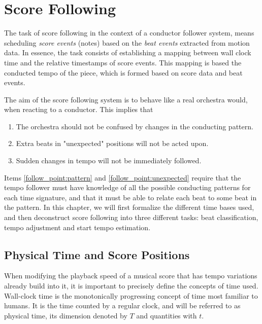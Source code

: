 \chapter{Score Following}
\label{chapter:score_following}

The task of score following in the context
of a conductor follower system,
means scheduling \textit{score events} (notes)
based on the \textit{beat events} extracted
from motion data.
In essence, the task consists of establishing a mapping between
wall clock time and the relative timestamps of score events.
This mapping is based the conducted tempo of the piece,
which is formed based on score data and beat events.

The aim of the score following system
is to behave like a real orchestra would,
when reacting to a conductor.
This implies that
\begin{enumerate}
\item The orchestra should not be confused by changes in the conducting pattern. \label{follow_point:pattern}
\item Extra beats in "unexpected" positions will not be acted upon. \label{follow_point:unexpected}
\item Sudden changes in tempo will not be immediately followed.
\end{enumerate}
Items \ref{follow_point:pattern} and \ref{follow_point:unexpected} require
that the tempo follower must have knowledge of all the possible
conducting patterns for each time signature,
and that it must be able to relate each beat to some beat in the pattern.
In this chapter,
we will first formalize the different time bases used,
and then deconstruct score following into
three different tasks:
beat classification, tempo adjustment and start tempo estimation.

\section{Physical Time and Score Positions}
\label{sec:meth:real_and_score_time}

When modifying the playback speed of a musical score
that has tempo variations already build into it,
it is important to precisely define the concepts of time used.
Wall-clock time is the monotonically progressing concept of time
most familiar to humans.
It is the time counted by a regular clock,
and will be referred to as physical time,
its dimension denoted by $T$ and quantities with $t$.

